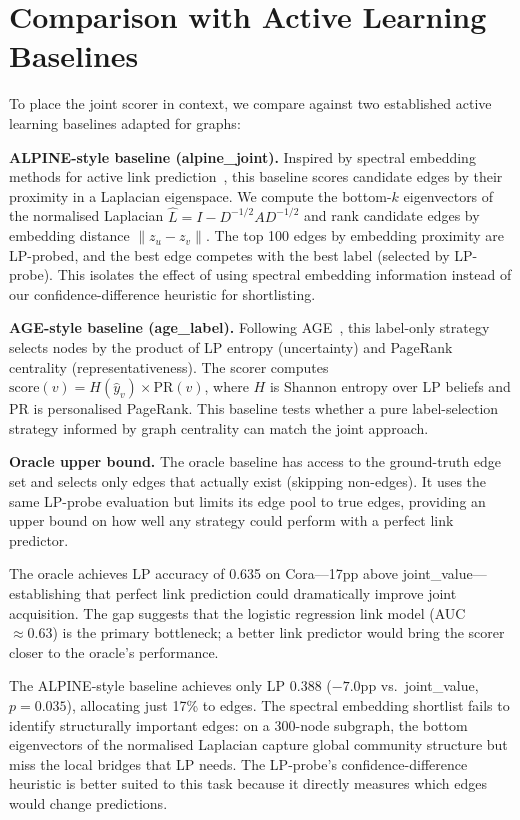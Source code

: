 \documentclass[12pt,a4paper,oneside]{report}
\begin{document}
\section{Comparison with Active Learning Baselines}
\label{sec:baselines}

To place the joint scorer in context, we compare against two established active learning baselines adapted for graphs:

\textbf{ALPINE-style baseline (alpine\_joint).} Inspired by spectral embedding methods for active link prediction~\citep{alpine}, this baseline scores candidate edges by their proximity in a Laplacian eigenspace. We compute the bottom-$k$ eigenvectors of the normalised Laplacian $\hat{L} = I - D^{-1/2}AD^{-1/2}$ and rank candidate edges by embedding distance $\|z_u - z_v\|$. The top 100 edges by embedding proximity are LP-probed, and the best edge competes with the best label (selected by LP-probe). This isolates the effect of using spectral embedding information instead of our confidence-difference heuristic for shortlisting.

\textbf{AGE-style baseline (age\_label).} Following AGE~\citep{age}, this label-only strategy selects nodes by the product of LP entropy (uncertainty) and PageRank centrality (representativeness). The scorer computes $\text{score}(v) = H(\hat{y}_v) \times \text{PR}(v)$, where $H$ is Shannon entropy over LP beliefs and PR is personalised PageRank. This baseline tests whether a pure label-selection strategy informed by graph centrality can match the joint approach.

\textbf{Oracle upper bound.} The oracle baseline has access to the ground-truth edge set and selects only edges that actually exist (skipping non-edges). It uses the same LP-probe evaluation but limits its edge pool to true edges, providing an upper bound on how well any strategy could perform with a perfect link predictor.

The oracle achieves LP accuracy of 0.635 on Cora---17pp above joint\_value---establishing that perfect link prediction could dramatically improve joint acquisition. The gap suggests that the logistic regression link model (AUC $\approx 0.63$) is the primary bottleneck; a better link predictor would bring the scorer closer to the oracle's performance.

The ALPINE-style baseline achieves only LP 0.388 ($-7.0$pp vs.\ joint\_value, $p = 0.035$), allocating just 17\% to edges. The spectral embedding shortlist fails to identify structurally important edges: on a 300-node subgraph, the bottom eigenvectors of the normalised Laplacian capture global community structure but miss the local bridges that LP needs. The LP-probe's confidence-difference heuristic is better suited to this task because it directly measures which edges would change predictions.
\end{document}
